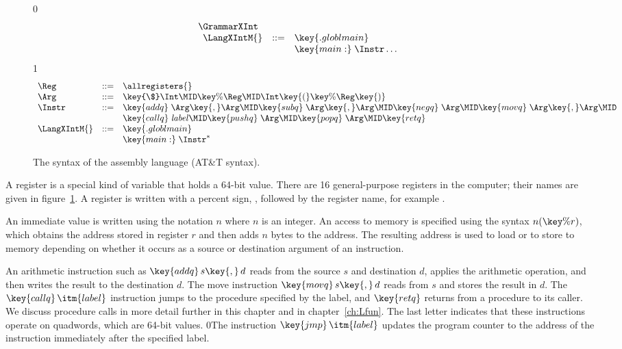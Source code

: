 \documentclass[7x10]{TimesAPriori_MIT}%
\def\racketEd{0}
\def\pythonEd{1}
\def\edition{1}
\newcommand{\racket}[1]{{\if\edition\racketEd{#1}\fi}}
\newcommand{\pythonColor}[0]{}
\numberwithin{theorem}{chapter}
\numberwithin{definition}{chapter}
\numberwithin{equation}{chapter}
\begin{document}
\begin{figure}[tp]
\begin{tcolorbox}[colback=white]
{\if\edition\racketEd    
\[
\begin{array}{l}
  \GrammarXInt \\
\begin{array}{lcl}
\LangXIntM{} &::= & \key{.globl main}\\
      &    & \key{main:} \; \Instr\ldots
\end{array}
\end{array}
\]
\fi}
{\if\edition\pythonEd\pythonColor
\[
\begin{array}{lcl}
\Reg &::=& \allregisters{} \\
\Arg &::=&  \key{\$}\Int \MID \key{\%}\Reg \MID \Int\key{(}\key{\%}\Reg\key{)}\\
\Instr &::=& \key{addq} \; \Arg\key{,} \Arg \MID
      \key{subq} \; \Arg\key{,} \Arg \MID
      \key{negq} \; \Arg \MID \key{movq} \; \Arg\key{,} \Arg \MID \\
  &&  \key{callq} \; \mathit{label} \MID
      \key{pushq}\;\Arg \MID \key{popq}\;\Arg \MID \key{retq} \\
\LangXIntM{} &::= & \key{.globl main}\\
      &    & \key{main:} \; \Instr^{*}
\end{array}
\]
\fi}
\end{tcolorbox}
\caption{The syntax of the \LangXInt{} assembly language (AT\&T syntax).}
\label{fig:x86-int-concrete}
\end{figure}

A register is a special kind of variable that holds a 64-bit
value. There are 16 general-purpose registers in the computer; their
names are given in figure~\ref{fig:x86-int-concrete}.  A register is
written with a percent sign, \key{\%}, followed by the register name,
for example .

An immediate value is written using the notation \key{\$}$n$ where $n$
is an integer.
%
%
An access to memory is specified using the syntax $n(\key{\%}r)$,
which obtains the address stored in register $r$ and then adds $n$
bytes to the address. The resulting address is used to load or to store
to memory depending on whether it occurs as a source or destination
argument of an instruction.

An arithmetic instruction such as $\key{addq}\,s\key{,}\,d$ reads from
the source $s$ and destination $d$, applies the arithmetic operation,
and then writes the result to the destination $d$. 
%
The move instruction $\key{movq}\,s\key{,}\,d$ reads from $s$ and
stores the result in $d$.
%
The $\key{callq}\,\itm{label}$ instruction jumps to the procedure
specified by the label, and $\key{retq}$ returns from a procedure to
its caller. 
%
We discuss procedure calls in more detail further in this chapter and
in chapter~\ref{ch:Lfun}.
%
The last letter  indicates that these instructions operate on
quadwords, which are 64-bit values.
%
\racket{The instruction $\key{jmp}\,\itm{label}$ updates the program
  counter to the address of the instruction immediately after the
  specified label.}
\end{document}

